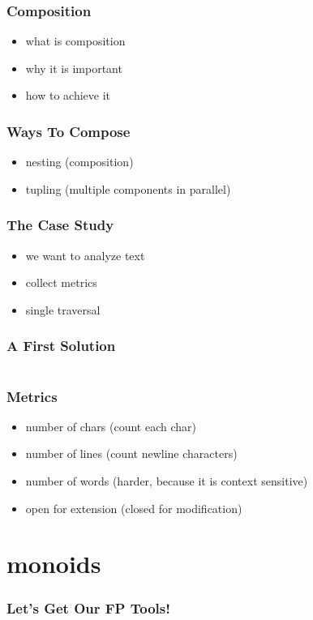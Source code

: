 \documentclass[aspectratio=169]{beamer}
\begin{document}
\begin{frame}
  \frametitle{Composition}
  \begin{itemize}
  \item what is composition
  \item why it is important
  \item how to achieve it
  \end{itemize}
\end{frame}

\begin{frame}
  \frametitle{Ways To Compose}
  \begin{itemize}
  \item nesting (composition)
  \item tupling (multiple components in parallel)
  \end{itemize}
\end{frame}

\begin{frame}
  \frametitle{The Case Study}
  \begin{itemize}
  \item we want to analyze text
  \item collect metrics
  \item single traversal
  \end{itemize}
\end{frame}

\begin{frame}[fragile]
  \frametitle{A First Solution}
  \inputminted[fontsize=\small]{scala}{snippets/imperative-wc.scala}
\end{frame}

\begin{frame}
  \frametitle{Metrics}
  \begin{itemize}
  \item number of chars (count each char)
  \item number of lines (count newline characters)
  \item number of words (harder, because it is context sensitive)
  \item open for extension (closed for modification)
  \end{itemize}
\end{frame}

\section{monoids}\label{sec:monoids}

\begin{frame}
  \frametitle{Let's Get Our FP Tools!}
\end{frame}
\end{document}
